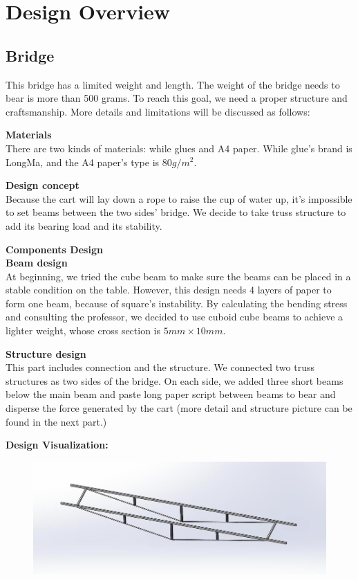\section{Design Overview}
\subsection{Bridge}
This bridge has a limited weight and length. The weight of the bridge needs to
bear is more than 500 grams. To reach this goal, we need a proper structure and
craftsmanship. More details and limitations will be discussed as follows: 

\bigskip
\noindent
\textbf{Materials} \\
\indent
There are two kinds of materials: while glues and A4 paper.
While glue's brand is LongMa, and the A4 paper’s type is 80$g/m^2$.

\bigskip
\noindent
\textbf{Design concept} \\
\indent
Because the cart will lay down a rope to raise the cup of water up, it’s
impossible to set beams between the two sides’ bridge. We decide to take truss
structure to add its bearing load and its stability.

 
\bigskip
\noindent
{\large\textbf{Components Design}} \\
\textbf{Beam design} \\
\indent
At beginning, we tried the cube beam to make sure the beams can be placed in a
stable condition on the table. However, this design needs 4 layers of paper to
form one beam, because of square’s instability. By calculating the bending
stress and consulting the professor, we decided to use cuboid cube beams to
achieve a lighter weight, whose cross section is $5mm\times10mm$. 


\bigskip
\noindent
\textbf{Structure design} \\
\indent
This part includes connection and the structure. We connected two truss
structures as two sides of the bridge. On each side, we added three short beams
below the main beam and paste long paper script between beams to bear and
disperse the force generated by the cart (more detail and structure picture can
be found in the next part.) 

\bigskip
\noindent
\textbf{Design Visualization:} \\
\indent

\begin{figure}[H]
\begin{center}
\includegraphics[width=15cm]{figure/designOverview/p3}
\end{center}
\end{figure}


